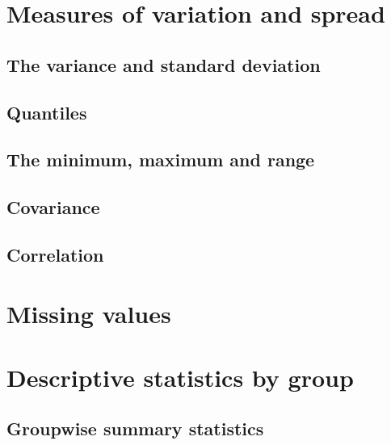 \documentclass[english,10pt,a4paper,oneside]{book}
\begin{document}
\hypertarget{measures-of-variation-and-spread}{%
\section{Measures of variation and spread}\label{measures-of-variation-and-spread}}

\hypertarget{the-variance-and-standard-deviation}{%
\subsection{The variance and standard deviation}\label{the-variance-and-standard-deviation}}

\hypertarget{quantiles}{%
\subsection{Quantiles}\label{quantiles}}

\hypertarget{the-minimum-maximum-and-range}{%
\subsection{The minimum, maximum and range}\label{the-minimum-maximum-and-range}}

\hypertarget{covariance}{%
\subsection{Covariance}\label{covariance}}

\hypertarget{correlation}{%
\subsection{Correlation}\label{correlation}}

\hypertarget{missing-values-1}{%
\section{Missing values}\label{missing-values-1}}

\hypertarget{descriptive-statistics-by-group}{%
\section{Descriptive statistics by group}\label{descriptive-statistics-by-group}}

\hypertarget{groupwise-summary-statistics}{%
\subsection{Groupwise summary statistics}\label{groupwise-summary-statistics}}
\end{document}
